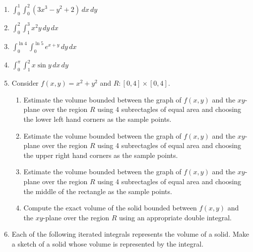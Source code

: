 \documentclass[12pt]{article}
\newif\ifans
\begin{document}
\begin{enumerate}

\item $\int_0^1\int_0^2\left(3x^3-y^2+2\right)\,dx\,dy$

\ifans{\fbox{$\frac{46}{3}$}} \fi

\item $\int_0^2\int_1^3 x^2y\,dy\,dx$

\ifans{\fbox{$\frac{32}{3}$}} \fi

\item $\int_0^{\ln{4}}\int_0^{\ln{5}}e^{x+y}\,dy\,dx$

\ifans{\fbox{$12$}} \fi

\item $\int_0^{\pi} \int_1^2 x\sin{y} \,dx \,dy$

\ifans{\fbox{$3$}} \fi

\item Consider $f(x,y)=x^2+y^2$ and $R:[0,4]\times[0,4]$.

\begin{enumerate}

\item Estimate the volume bounded between the graph of $f(x,y)$ and the $xy$-plane over the region $R$ using 4 subrectagles of equal area and choosing the lower left hand corners as the sample points.

\ifans{\fbox{$64$}} \fi

\item Estimate the volume bounded between the graph of $f(x,y)$ and the $xy$-plane over the region $R$ using 4 subrectagles of equal area and choosing the upper right hand corners as the sample points.

\ifans{\fbox{$320$}} \fi

\item Estimate the volume bounded between the graph of $f(x,y)$ and the $xy$-plane over the region $R$ using 4 subrectagles of equal area and choosing the middle of the rectangle as the sample points.

\ifans{\fbox{$160$}} \fi

\item Compute the exact volume of the solid bounded between $f(x,y)$ and the $xy$-plane over the region $R$ using an appropriate double integral.

\ifans{\fbox{$\frac{512}{3}$}} \fi

\end{enumerate}

\item Each of the following iterated integrals represents the volume of a solid.  Make a sketch of a solid whose volume is represented by the integral.  


\end{enumerate}
\end{document}

